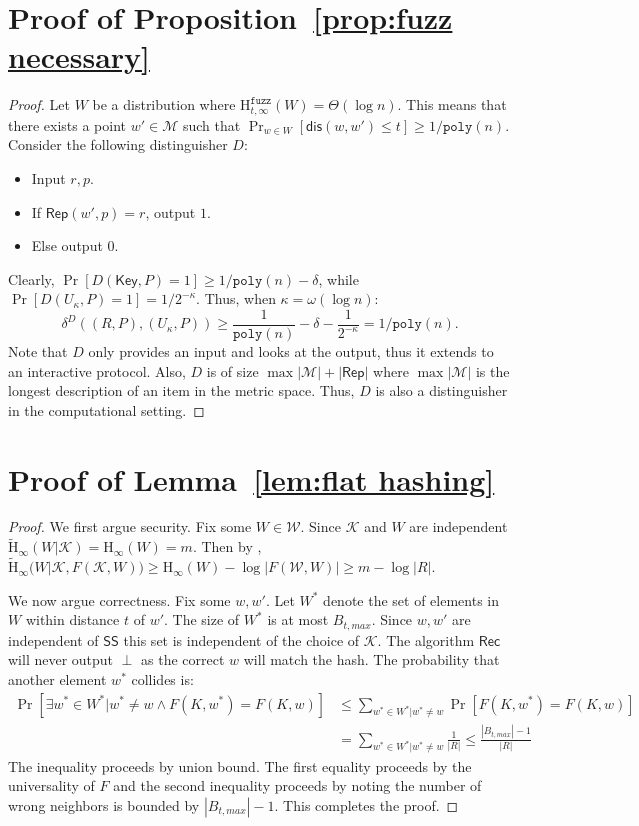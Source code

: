 \documentclass[11pt]{article}
\newcommand{\lemref}[1]{\mbox{Lemma~\ref{#1}}}
\newcommand{\propref}[1]{\mbox{Proposition~\ref{#1}}}
\newcommand{\class}[1]{{\ensuremath{\mathsf{#1}}}}
\newcommand{\Key}{\ensuremath{\class{Key}}\xspace}
\newcommand{\rep}{\ensuremath{\class{Rep}}\xspace}
\newcommand{\sketch}{\ensuremath{\class{SS}}\xspace}
\newcommand{\rec}{\ensuremath{\class{Rec}}\xspace}
\newcommand{\dis}{\ensuremath{\mathsf{dis}}}
\newcommand{\poly}{\ensuremath{\mathtt{poly}}\xspace}
\newcommand{\Hoo}{\mathrm{H}_\infty}
\newcommand{\Hav}{\tilde{\mathrm{H}}_\infty}
\newcommand{\Hfuzz}{\mathrm{H}^{\mathtt{fuzz}}_{t,\infty}}
\begin{document}
\section{Proof of \propref{prop:fuzz necessary}}
\label{sec:proof fuzz necessary}
\begin{proof}
Let $W$ be a distribution where $\Hfuzz(W) = \Theta(\log n)$.  This means that there exists a point $w' \in \mathcal{M}$ such that $\Pr_{w\in W}[\dis (w, w')\leq t] \geq 1/\poly(n)$.  Consider the following distinguisher $D$:
\begin{itemize}
\item Input $r, p$.
\item If $\rep(w', p) = r$, output $1$.
\item Else output $0$.
\end{itemize}
Clearly, $\Pr[D(\Key, P) = 1]\geq 1/\poly(n) - \delta$, while $\Pr[D(U_\kappa, P)=1 ]= 1/2^{-\kappa}$.  Thus, when $\kappa = \omega(\log n)$:
\[
\delta^D((R, P), (U_\kappa, P))\geq \frac{1}{\poly(n)} -\delta -  \frac{1}{2^{-\kappa}} = 1/\poly(n).
\]
Note that $D$ only provides an input and looks at the output, thus it extends to an interactive protocol.  Also, $D$ is of size $\max |\mathcal{M}|+ |\rep|$ where $\max |\mathcal{M}|$ is the longest description of an item in the metric space.  Thus, $D$ is also a distinguisher in the computational setting.
\end{proof}

\section{Proof of \lemref{lem:flat hashing}}
\label{sec:proof of flat hashing}
\begin{proof}
We first argue security.  Fix some $W\in\mathcal{W}$. Since $\mathcal{K}$ and $W$ are independent $\Hav(W | \mathcal{K}) = \Hoo(W) = m$.  Then by \cite[Lemma 2.2b]{DBLP:journals/siamcomp/DodisORS08}, $\Hav(W | \mathcal{K}, F(\mathcal{K}, W)) \ge \Hoo(W) - \log |F(\mathcal{W}, W)| \ge m - \log |R|$.

We now argue correctness.  Fix some $w, w'$.  Let $W^*$ denote the set of elements in $W$ within distance $t$ of $w'$.  The size of $W^*$ is at most $B_{t, max}$.  Since $w, w'$ are independent of $\sketch$ this set is independent of the choice of $\mathcal{K}$.  The algorithm  $\rec$ will never output $\perp$ as the correct $w$ will match the hash.  The probability that another element $w^*$ collides is:
\begin{align*}
\Pr[\exists w^* \in W^* |w^* \neq w \wedge F(K, w^*) = F(K, w)] &\le \sum_{w^*\in W^* | w^*\neq w} \Pr[F(K, w^*) = F(K, w)] \\
 &= \sum_{w^*\in W^* | w^*\neq w} \frac{1}{|R|} \le \frac{|B_{t, max}|-1}{|R|}
\end{align*}
The inequality proceeds by union bound. The first equality proceeds by the universality of $F$ and the second inequality proceeds by noting the number of wrong neighbors is bounded by $|B_{t, max}|-1$.  This completes the proof.
\end{proof}
\end{document}

